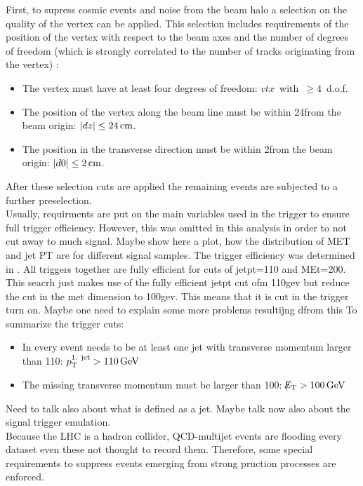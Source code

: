 First, to supress cosmic events and noise from the beam halo a selection on the quality of the vertex can be applied.
This selection includes requirements of the position of the vertex with respect to the beam axes and the number of degrees of freedom (which is strongly correlated to the number of tracks originating from the vertex) \cite{bib:CMS:Tracking_7TeV_PAS}:  
\begin{itemize}
\renewcommand{\labelitemi}{\footnotesize{\ding{118}}}
\item The vertex must have at least four degrees of freedom: \mbox{$vtx$ with $\geq 4$ d.o.f.}
\item The position of the vertex along the beam line must be within 24\cm from the beam origin: \mbox{$|dz| \leq 24\,\text{cm}$.}
\item The position in the transverse direction must be within 2\cm from the beam origin: \mbox{$|d0| \leq 2\,\text{cm}$.}
\end{itemize}
After these selection cuts are applied the remaining events are subjected to a further preselection.\\

Usually, requirments are put on the main variables used in the trigger to ensure full trigger efficiency.
However, this was omitted in this analysis in order to not cut away to much signal.
Maybe show here a plot, how the distribution of MET and jet PT are for different signal samples.
The trigger efficiency was determined in \cite{blabla}.
All triggers together are fully efficient for cuts of jetpt=110 and MEt=200.
This seacrh just makes use of the fully efficient jetpt cut ofm 110gev but reduce the cut in the met dimension to 100gev.
This means that it is cut in the trigger turn on.
Maybe one need to explain some more problems resultijng dfrom this
To summarize the trigger cuts:
\begin{itemize}
\renewcommand{\labelitemi}{\footnotesize{\ding{118}}}
\item In every event needs to be at least one jet with transverse momentum larger than 110\gev: \mbox{$p_{\text{T}}^{\text{1. jet}}>110\,\text{Ge}\kern-0.06667em\text{V}$}
\item The missing transverse momentum must be larger than 100\gev: \mbox{$\slash\mkern-12mu{E}_{\text{T}}>100\,\text{Ge}\kern-0.06667em\text{V}$}
\end{itemize}
Need to talk also about what is defined as a jet.
Maybe talk now also about the signal trigger emulation.\\

Because the LHC is a hadron collider, QCD-multijet events are flooding every dataset even these not thought to record them.
Therefore, some special requirements to suppress events emerging from strong pruction processes are enforced. 

